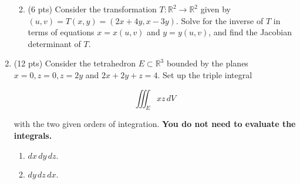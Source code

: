 \documentclass[12 pt]{report}
\begin{document}
\begin{enumerate}
\begin{enumerate}
\vfill

\item (6 pts) Consider the transformation $T: \mathbb{R}^2 \to \mathbb{R}^2$ given by $(u,v) = T(x,y) = (2x + 4y, x - 3y)$. Solve for the inverse of $T$ in terms of equations $x = x(u,v)$ and $y = y(u,v)$, and find the Jacobian determinant of $T$. 

\vfill 

\end{enumerate}


\newpage


\item (12 pts) Consider the tetrahedron $E \subset \mathbb{R}^3$ bounded by the planes $x = 0, z = 0, z = 2y$ and $2x + 2y + z = 4$. Set up the triple integral 

\[
\iiint_E xz \, dV
\]

with the two given orders of integration. \textbf{You do not need to evaluate the integrals.}

\begin{enumerate} \item $dx \,dy \,dz.$
\vfill


\item $dy \, dz \, dx.$
\vfill
\end{enumerate}


%
%
%
%
%
%
%

\end{enumerate}
\end{document}
